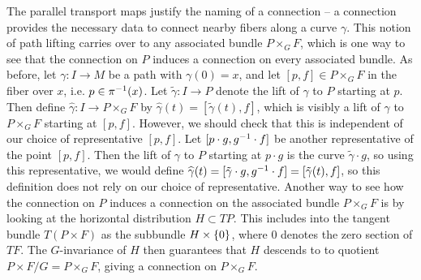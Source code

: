 The parallel transport maps justify the naming of a connection -- a connection
provides the necessary data to connect nearby fibers along a curve $\gamma$.
This notion of path lifting carries over to any associated bundle $P \times_G F$,
which is one way to see that the connection on $P$ induces a connection on
every associated bundle. As before, let $\gamma : I \to M$ be a path
with $\gamma(0) = x$, and let $[p,f] \in P \times_G F$ in the fiber over $x$,
i.e. $p \in \pi^{-1}(x)$. Let $\tilde{\gamma} : I \to P$ denote the lift
of $\gamma$ to $P$ starting at $p$. Then define
$\widehat{\gamma} : I \to P \times_G F$ by
$\widehat{\gamma}(t) = [\tilde{\gamma}(t), f]$, which is visibly a lift of
$\gamma$ to $P \times_G F$ starting at $[p,f]$. However, we should check that
this is independent of our choice of representative $[p,f]$. Let
$[p\cdot g, g^{-1} \cdot f]$ be another representative of the point $[p,f]$.
Then the lift of $\gamma$ to $P$ starting at $p \cdot g$ is the curve
$\tilde{\gamma} \cdot g$, so using this representative, we would define
$\widehat{\gamma}(t) = [\tilde{\gamma} \cdot g, g^{-1} \cdot f] =
[\tilde{\gamma}(t), f]$, so this definition does not rely on our choice of
representative. Another way to see how the connection on $P$ induces a
connection on the associated bundle $P \times_G F$ is by looking at the
horizontal distribution $H \subset TP$. This includes into the tangent bundle
$T(P \times F)$ as the subbundle $H \times \left\lbrace 0 \right\rbrace$, where $0$ denotes the
zero section of $TF$. The $G$-invariance of $H$ then guarantees that $H$
descends to to quotient $P \times F / G = P \times_G F$, giving a connection on
$P \times_G F$. \\
%

